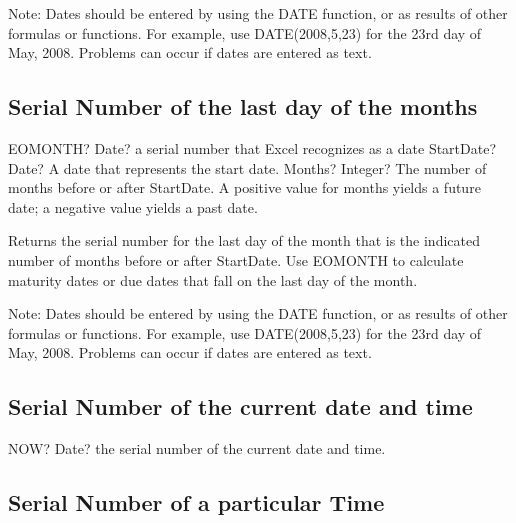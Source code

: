 Note: Dates should be entered by using the DATE function, or as results of other formulas or functions. For example, use DATE(2008,5,23) for the 23rd day of May, 2008. Problems can occur if dates are entered as text.





\subsection{Serial Number of the last day of the months}

\begin{mpFunctionsExtract}
	\mpWorksheetFunctionTwoNotImplemented
	{EOMONTH? Date? a serial number that Excel recognizes as a date}
	{StartDate? Date? A date that represents the start date.}
	{Months? Integer? The number of months before or after StartDate. A positive value for months yields a future date; a negative value yields a past date.}
\end{mpFunctionsExtract}

\vspace{0.3cm}
Returns the serial number for the last day of the month that is the indicated number of months before or after StartDate. Use EOMONTH to calculate maturity dates or due dates that fall on the last day of the month.

Note: Dates should be entered by using the DATE function, or as results of other formulas or functions. For example, use DATE(2008,5,23) for the 23rd day of May, 2008. Problems can occur if dates are entered as text.





\subsection{Serial Number of the current date and time}

\begin{mpFunctionsExtract}
	\mpWorksheetFunctionZeroNotImplemented
	{NOW? Date? the serial number of the current date and time.}
\end{mpFunctionsExtract}




\subsection{Serial Number of a particular Time}

